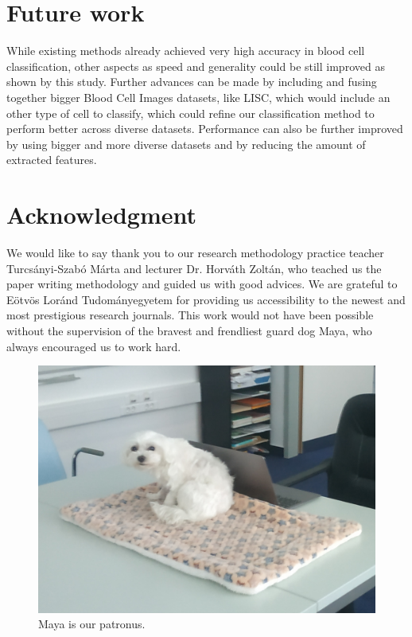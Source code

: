 \documentclass[conference]{IEEEtran}
\begin{document}
\section{Future work}

While existing methods already achieved very high accuracy in blood cell classification, other aspects as speed and generality could be still improved as shown by this study. 
Further advances can be made by including and fusing together bigger Blood Cell Images datasets, like LISC, which would include an other type of cell to classify, which could refine our classification method to perform better across diverse datasets.
Performance can also be further improved by using bigger and more diverse datasets and by reducing the
amount of extracted features.

\section*{Acknowledgment}

We would like to say thank you to our research methodology practice teacher Turcsányi-Szabó Márta and lecturer Dr. Horváth Zoltán, who teached us the paper writing methodology and guided us with good advices.
We are grateful to Eötvös Loránd Tudományegyetem for providing us accessibility to the newest and most prestigious research journals.
This work would not have been possible without the supervision of the bravest and frendliest guard dog Maya, who always encouraged us to work hard.

\begin{figure}[htbp]
    \begin{center}
    \includegraphics[scale=0.16]{IMG_20221019_165459.jpg}
    \end{center}
    \caption{Maya is our patronus.}
\end{figure}
\end{document}
